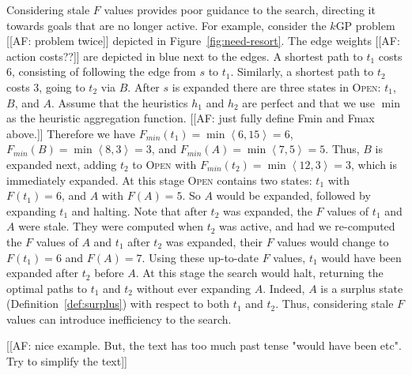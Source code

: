 \documentclass[twoside,11pt]{article}
\newcommand{\kgs}{$k$GP\xspace}
\newcommand{\tuple}[1]{\ensuremath{\left \langle #1 \right \rangle }}
\newcommand{\open}{\textsc{Open}\xspace}
\begin{document}

Considering stale $F$ values provides poor guidance to the search, directing it towards goals that are no longer active.
For example, consider the \kgs problem [[AF: problem twice]] depicted in Figure~\ref{fig:need-resort}.
The edge weights [[AF: action costs??]] are depicted in blue next to the edges.
A shortest path to $t_1$ costs 6, consisting of following the edge from $s$ to $t_1$. Similarly, a shortest path to $t_2$ costs 3, going to $t_2$ via $B$.
After $s$ is expanded there are three states in \open: $t_1$, $B$, and $A$.
Assume that the heuristics $h_1$ and $h_2$ are perfect and that we use $\min$ as the heuristic aggregation function. [[AF: just fully define Fmin and Fmax above.]]
Therefore we have $F_{min}(t_1) = \min \tuple{6, 15} = 6$, $F_{min}(B) = \min \tuple{8, 3} = 3$, and $F_{min}(A) = \min \tuple{7, 5} = 5$.
Thus, $B$ is expanded next, adding $t_2$ to \open with $F_{min}(t_2) = \min \tuple{12, 3} = 3$, which is immediately expanded.
At this stage \open contains two states: $t_1$ with $F(t_1) = 6$, and $A$ with $F(A) = 5$.
So $A$ would be expanded, followed by expanding $t_1$ and halting.
Note that after $t_2$ was expanded, the $F$ values of $t_1$ and $A$ were stale.
They were computed when $t_2$ was active, and had we re-computed the $F$ values of $A$ and $t_1$ after $t_2$ was expanded, their $F$ values would change to $F(t_1) = 6$ and $F(A) = 7$.
Using these up-to-date $F$ values, $t_1$ would have been expanded after $t_2$ before $A$.
At this stage the search would halt, returning the optimal paths to $t_1$ and $t_2$ without ever expanding $A$.
Indeed, $A$ is a surplus state (Definition~\ref{def:surplus}) with respect to both $t_1$ and $t_2$.
Thus, considering stale $F$ values can introduce inefficiency to the search.

[[AF: nice example. But, the text has too much past tense "would have been etc". Try to simplify the text]]
\end{document}
